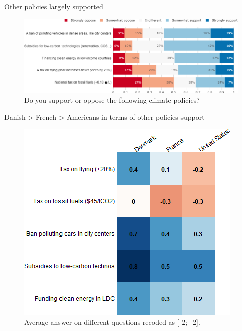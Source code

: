 \begin{framefont}{\small}
\begin{frame}{Other policies largely supported}%
\begin{figure}[h!]
\centering
\caption{Do you support or oppose the following climate policies?}
\vspace{2mm}
\includegraphics[width=.87\paperwidth]{../figures/FR/policy_FR.png}
\end{figure}
\end{frame}

\begin{frame}{Danish > French > Americans in terms of other policies support}%
\begin{figure}[h!]
\centering
\caption{Average answer on different questions recoded as [-2;+2].}
\vspace{2mm}
\includegraphics[height=.78\paperheight]{../figures/country_comparison/policy_mean_countries.png}
\end{figure}
\end{frame}


\end{framefont}
